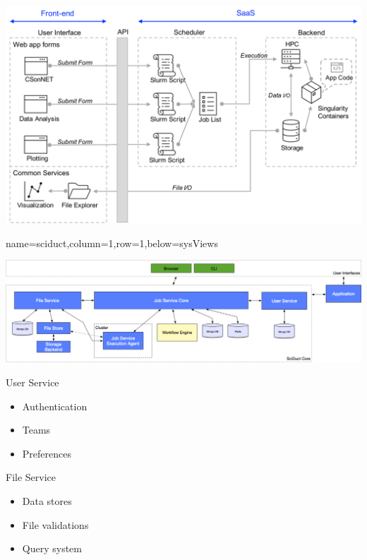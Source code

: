 \documentclass[landscape,paperwidth=70in,paperheight=46in,fontscale=0.225]{baposter} %
\begin{document}
\begin{poster}
{\begin{minipage}{.71\textwidth}
\includegraphics[scale=0.2]{figures/netsci_ops_v6.pdf}
\end{minipage}

}

          {name=sciduct,column=1,row=1,below=sysViews}{
          
\includegraphics[scale=0.27]{figures/sciduct.png}

\vspace{5mm}
\noindent 
\begin{minipage}[t]{0.32\columnwidth}
User Service

\small{\begin{itemize}[leftmargin=*,noitemsep,topsep=0pt]
	\item Authentication
	\item Teams
	\item Preferences
\end{itemize}}
\end{minipage}
\hfill
\noindent
\begin{minipage}[t]{0.32\columnwidth}
File Service

\small{\begin{itemize}[leftmargin=*,noitemsep,topsep=0pt]
	\item Data stores
	\item File validations
	\item Query system
\end{itemize}}


\end{minipage}}
\end{poster}
\end{document}
